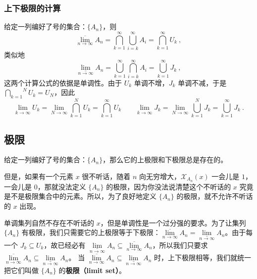 \subsubsection{上下极限的计算}
给定一列编好了号的集合：$\{A_n\}$，则
\begin{equation}
\underset{n\to \infty}{\overline{\lim}} A_n = \overset {\infty}{\underset{k=1}{\bigcap}} \overset{\infty}{\underset{i=k}{\bigcup}} A_i = \overset{\infty}{\underset{k=1}{\bigcap}} U_k~,
\end{equation}
类似地
\begin{equation}
\underset{n\to \infty}{\underline{\lim}}A_n=\overset{\infty}{\underset{k=1}{\bigcup}}\overset{\infty}{\underset{i=k}{\bigcap}} A_i=\overset{\infty} {\underset{k=1}{\bigcup}} J_k~,
\end{equation}
这两个计算公式的依据是单调性。由于 $U_k$ 单调不增，$J_k$ 单调不减，于是 $\displaystyle \overset{N}{\underset{k=1}{\bigcap}}U_k=U_N$，因此
\begin{equation}
\lim_{k\to\infty}U_k=\lim\limits_{N\to\infty}\overset{N}{\underset{k=1}{\bigcap}} U_k=\overset{\infty}{\underset{k=1}{\bigcap}}U_k
\qquad
\lim\limits_{k\to\infty}J_k=\lim\limits_{N\to\infty}\overset{N}{\underset{k=1}{\bigcup}} J_k=\overset{\infty}{\underset{k=1}{\bigcup}} J_k~.
\end{equation}

\subsection{极限}
给定一列编好了号的集合：$\{A_n\}$，那么它的上极限和下极限总是存在的。

但是，如果有一个元素 $x$ 很不听话，随着 $n$ 向无穷增大，$\mathcal{X}_{A_n}(x)$ 一会儿是 $1$，一会儿是 $0$，那就没法定义 $\{A_n\}$ 的极限，因为你没法说清楚这个不听话的 $x$ 究竟是不是极限集合中的元素。所以，为了良好地定义 $\{A_n\}$ 的极限，就不允许不听话的 $x$ 出现。

单调集列自然不存在不听话的 $x$，但是单调性是一个过分强的要求。为了让集列 $\{A_n\}$ 有极限，我们只需要它的上极限等于下极限：$\underset{n\to \infty}{\overline{\lim}} A_n=\underset{n\to \infty}{\underline{\lim}} A_n$。由于每一个 $J_k\subseteq U_k$，故已经必有 $\underset{n\to \infty}{\underline{\lim}} A_n\subseteq \underset{n\to \infty}{\overline{\lim}} A_n$，所以我们只要求 $\underset{n\to \infty}{\overline{\lim}}A_n\subseteq \underset{n\to \infty}{\underline{\lim}} A_n$。
当 $\underset{n\to \infty}{\overline{\lim}} A_n\subseteq \underset{n\to \infty}{\underline{\lim}} A_n$ 时，上下极限相等，我们就统一把它们叫做 $\{A_n\}$ 的\textbf{极限（limit set）}。
